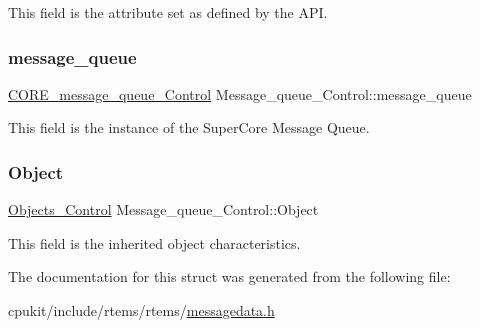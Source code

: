 This field is the attribute set as defined by the A\+PI. \mbox{\label{structMessage__queue__Control_aee6e7397c76d25b3eb4ea97ad25d3927}} 
\subsubsection{\texorpdfstring{message\_queue}{message\_queue}}
{\footnotesize\ttfamily \mbox{\hyperlink{structCORE__message__queue__Control}{C\+O\+R\+E\+\_\+message\+\_\+queue\+\_\+\+Control}} Message\+\_\+queue\+\_\+\+Control\+::message\+\_\+queue}

This field is the instance of the Super\+Core Message Queue. \mbox{\label{structMessage__queue__Control_adf90be8799c2cee63fb9afcb74af07eb}} 
\subsubsection{\texorpdfstring{Object}{Object}}
{\footnotesize\ttfamily \mbox{\hyperlink{structObjects__Control}{Objects\+\_\+\+Control}} Message\+\_\+queue\+\_\+\+Control\+::\+Object}

This field is the inherited object characteristics. 

The documentation for this struct was generated from the following file\+:\begin{DoxyCompactItemize}
\item 
cpukit/include/rtems/rtems/\mbox{\hyperlink{messagedata_8h}{messagedata.\+h}}\end{DoxyCompactItemize}
